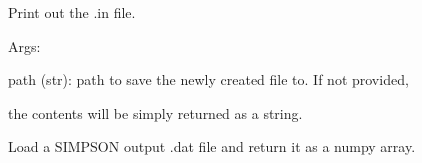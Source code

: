 \documentclass[letterpaper,10pt,english]{sphinxmanual}
\begin{document}
\begin{fulllineitems}

\begin{fulllineitems}
\label{doctree/soprano.calculate.nmr.simpson:soprano.calculate.nmr.simpson.SimpsonSequence.write_input}
Print out the .in file.

\begin{DUlineblock}{0em}
\item[] Args:
\item[]
\begin{DUlineblock}{\DUlineblockindent}
\item[] path (str): path to save the newly created file to. If not provided,
\item[]
\begin{DUlineblock}{\DUlineblockindent}
\item[] the contents will be simply returned as a string.
\end{DUlineblock}
\end{DUlineblock}
\end{DUlineblock}

\end{fulllineitems}


\end{fulllineitems}


\begin{fulllineitems}
\label{doctree/soprano.calculate.nmr.simpson:soprano.calculate.nmr.simpson.load_simpson_dat}
Load a SIMPSON output .dat file and return it as a numpy array.

\end{fulllineitems}

\end{document}
